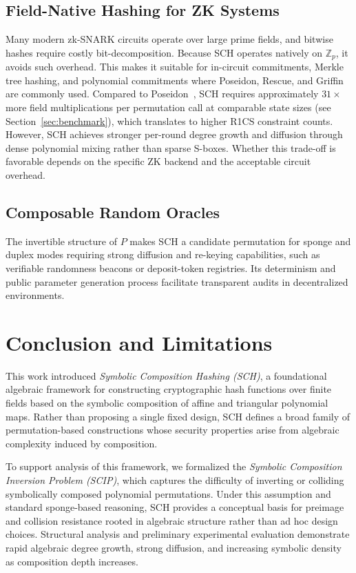 ﻿\documentclass[english]{aucmcs}
\begin{document}
\subsection{Field-Native Hashing for ZK Systems}

Many modern zk-SNARK circuits operate over large prime fields, and bitwise
hashes require costly bit-decomposition.  Because SCH operates natively on
$\mathbb{Z}_p$, it avoids such overhead.  This makes it suitable for in-circuit
commitments, Merkle tree hashing, and polynomial commitments where Poseidon,
Rescue, and Griffin are commonly used. Compared to Poseidon~\cite{Poseidon}, SCH requires approximately $31\times$ more field multiplications per permutation call at comparable state sizes (see Section~\ref{sec:benchmark}), which translates to higher R1CS constraint counts. However, SCH achieves stronger per-round degree growth and diffusion through dense polynomial mixing rather than sparse S-boxes. Whether this trade-off is favorable depends on the specific ZK backend and the acceptable circuit overhead.

\subsection{Composable Random Oracles}

The invertible structure of $P$ makes SCH a candidate permutation for sponge
and duplex modes requiring strong diffusion and re-keying capabilities, such as
verifiable randomness beacons or deposit-token registries.  Its determinism and
public parameter generation process facilitate transparent audits in
decentralized environments.

\section{Conclusion and Limitations}
\label{sec:conclusion}

This work introduced \emph{Symbolic Composition Hashing (SCH)}, a foundational algebraic framework for constructing cryptographic hash functions over finite fields based on the symbolic composition of affine and triangular polynomial maps. Rather than proposing a single fixed design, SCH defines a broad family of permutation-based constructions whose security properties arise from algebraic complexity induced by composition.

To support analysis of this framework, we formalized the \emph{Symbolic Composition Inversion Problem (SCIP)}, which captures the difficulty of inverting or colliding symbolically composed polynomial permutations. Under this assumption and standard sponge-based reasoning, SCH provides a conceptual basis for preimage and collision resistance rooted in algebraic structure rather than ad hoc design choices. Structural analysis and preliminary experimental evaluation demonstrate rapid algebraic degree growth, strong diffusion, and increasing symbolic density as composition depth increases.
\end{document}
